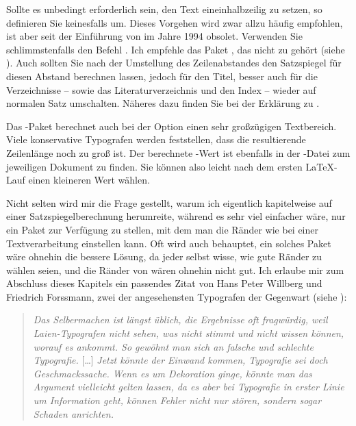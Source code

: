 Sollte es unbedingt erforderlich sein, den Text eineinhalbzeilig zu setzen, so
definieren Sie keinesfalls  um. Dieses Vorgehen wird
zwar allzu häufig empfohlen, ist aber seit der Einführung von {\LaTeXe} im
Jahre 1994 obsolet.  Verwenden Sie schlimmstenfalls den Befehl
. Ich empfehle das Paket
, das
nicht zu {\KOMAScript} gehört (siehe \cite{package:setspace}).  Auch sollten
Sie  nach der Umstellung des Zeilenabstandes den Satzspiegel
für diesen Abstand berechnen lassen, jedoch für den Titel, besser auch für die
Verzeichnisse -- sowie das Literaturverzeichnis und den Index -- wieder auf
normalen Satz umschalten. Näheres dazu finden Sie bei der Erklärung zu
%
.

Das -Paket berechnet auch bei der Option
%
 einen sehr großzügigen
Textbereich. Viele konservative Typografen werden feststellen, dass die
resultierende Zeilenlänge noch zu groß ist. Der berechnete
-Wert ist ebenfalls in der -Datei zum
jeweiligen Dokument zu finden. Sie können also leicht nach dem ersten
\LaTeX-Lauf einen kleineren Wert wählen.

Nicht selten wird mir die Frage gestellt, warum ich
eigentlich kapitelweise auf einer Satzspiegelberechnung herumreite, während es
sehr viel einfacher wäre, nur ein Paket zur Verfügung zu stellen, mit dem man
die Ränder wie bei einer Textverarbeitung einstellen kann.  Oft wird auch
behauptet, ein solches Paket wäre ohnehin die bessere Lösung, da jeder selbst
wisse, wie gute Ränder zu wählen seien, und die Ränder von {\KOMAScript} wären
ohnehin nicht gut. Ich erlaube mir zum Abschluss dieses Kapitels ein passendes
Zitat von Hans Peter Willberg und Friedrich Forssmann, zwei der angesehensten
Typografen der Gegenwart (siehe \cite{TYPO:ErsteHilfe}):
\begin{quote}
  \label{sec:typearea.tips.cite}%
  \textit{Das Selbermachen ist längst üblich, die Ergebnisse
    oft fragwürdig, weil Laien-Typografen nicht sehen, was nicht stimmt und
    nicht wissen können, worauf es ankommt. So gewöhnt man sich an falsche und
    schlechte Typografie.} [\dots] \textit{Jetzt könnte der Einwand kommen,
    Typografie sei doch Geschmackssache. Wenn es um Dekoration ginge, könnte
    man das Argument vielleicht gelten lassen, da es aber bei Typografie in
    erster Linie um Information geht, können Fehler nicht nur stören, sondern
    sogar Schaden anrichten.}
\end{quote}
%
\EndIndexGroup

